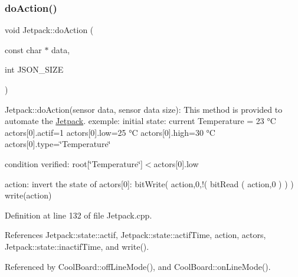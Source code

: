\subsubsection{\texorpdfstring{do\+Action()}{doAction()}}
{\footnotesize\ttfamily void Jetpack\+::do\+Action (\begin{DoxyParamCaption}\item[{const char $\ast$}]{data,  }\item[{int}]{J\+S\+O\+N\+\_\+\+S\+I\+ZE }\end{DoxyParamCaption})}

Jetpack\+::do\+Action(sensor data, sensor data size)\+: This method is provided to automate the \hyperlink{classJetpack}{Jetpack}. exemple\+: initial state\+: current Temperature = 23 °C actors\mbox{[}0\mbox{]}.actif=1 actors\mbox{[}0\mbox{]}.low=25 °C actors\mbox{[}0\mbox{]}.high=30 °C actors\mbox{[}0\mbox{]}.type=\char`\"{}\+Temperature\char`\"{}

condition verified\+: root\mbox{[}\char`\"{}\+Temperature\char`\"{}\mbox{]}$<$actors\mbox{[}0\mbox{]}.low

action\+: invert the state of actors\mbox{[}0\mbox{]}\+: bit\+Write( action,0,!( bit\+Read ( action,0 ) ) ) write(action) 

Definition at line 132 of file Jetpack.\+cpp.



References Jetpack\+::state\+::actif, Jetpack\+::state\+::actif\+Time, action, actors, Jetpack\+::state\+::inactif\+Time, and write().



Referenced by Cool\+Board\+::off\+Line\+Mode(), and Cool\+Board\+::on\+Line\+Mode().



